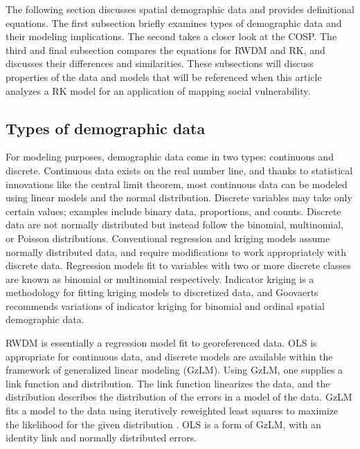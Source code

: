 \documentclass[draft]{article}
\begin{document}
The following section discusses spatial demographic data and provides definitional equations.  The first subsection briefly examines types of demographic data and their modeling implications.  The second takes a closer look at the COSP.  The third and final subsection compares the equations for RWDM and RK, and discusses their differences and similarities.  These subsections will discuss properties of the data and models that will be referenced when this article analyzes a RK model for an application of mapping social vulnerability.


\subsection{Types of demographic data}

For modeling purposes, demographic data come in two types: continuous and discrete.  Continuous data exists on the real number line, and thanks to statistical innovations like the central limit theorem, most continuous data can be modeled using linear models and the normal distribution.  Discrete variables may take only certain values; examples include binary data, proportions, and counts.  Discrete data are not normally distributed but instead follow the binomial, multinomial, or Poisson distributions.  Conventional regression and kriging models assume normally distributed data, and require modifications to work appropriately with discrete data.  Regression models fit to variables with two or more discrete classes are known as binomial or multinomial respectively.  Indicator kriging is a methodology for fitting kriging models to discretized data, and Goovaerts \cite{goovaerts10} recommends variations of indicator kriging for binomial and ordinal spatial demographic data.

RWDM is essentially a regression model fit to georeferenced data.  OLS is appropriate for continuous data, and discrete models are available within the framework of generalized linear modeling (GzLM).  Using GzLM, one supplies a link function and distribution.  The link function linearizes the data, and the distribution describes the distribution of the errors in a model of the data.  GzLM fits a model to the data using iteratively reweighted least squares to maximize the likelihood for the given distribution \cite{nelder72}.  OLS is a form of GzLM, with an identity link and normally distributed errors.  %
\end{document}
